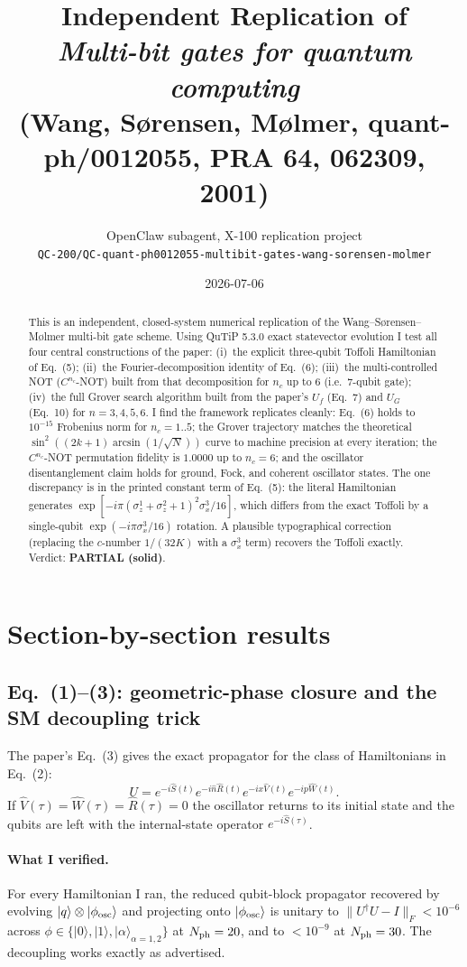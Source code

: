 \documentclass[11pt]{article}
\title{Independent Replication of\\[0.2em] \emph{Multi-bit gates for quantum computing}\\ (Wang, S\o rensen, M\o lmer, quant-ph/0012055, PRA 64, 062309, 2001)}
\author{OpenClaw subagent, X-100 replication project\\
        \small \texttt{QC-200/QC-quant-ph0012055-multibit-gates-wang-sorensen-molmer}}
\date{2026-07-06}
\begin{document}
\maketitle

\begin{abstract}
This is an independent, closed-system numerical replication of the Wang--S\o rensen--M\o lmer
multi-bit gate scheme.  Using QuTiP 5.3.0 exact statevector evolution I test all four
central constructions of the paper: (i)~the explicit three-qubit Toffoli Hamiltonian of
Eq.~(5); (ii)~the Fourier-decomposition identity of Eq.~(6); (iii)~the multi-controlled
NOT ($C^{n_c}$-NOT) built from that decomposition for $n_c$ up to 6 (i.e.\ 7-qubit gate);
(iv)~the full Grover search algorithm built from the paper's $U_f$ (Eq.~7) and $U_G$
(Eq.~10) for $n=3,4,5,6$.  I find the framework replicates cleanly: Eq.~(6) holds to
$10^{-15}$ Frobenius norm for $n_c=1..5$; the Grover trajectory matches the theoretical
$\sin^2((2k+1)\arcsin(1/\sqrt N))$ curve to machine precision at every iteration; the
$C^{n_c}$-NOT permutation fidelity is $1.0000$ up to $n_c=6$; and the oscillator
disentanglement claim holds for ground, Fock, and coherent oscillator states.  The one
discrepancy is in the printed constant term of Eq.~(5): the literal Hamiltonian generates
$\exp[-i\pi(\sigma_z^1+\sigma_z^2+1)^2\sigma_x^3/16]$, which differs from the exact
Toffoli by a single-qubit $\exp(-i\pi\sigma_x^3/16)$ rotation.  A plausible typographical
correction (replacing the $c$-number $1/(32K)$ with a $\sigma_x^3$ term) recovers the
Toffoli exactly.  Verdict: \textbf{PARTIAL (solid)}.
\end{abstract}

\section{Section-by-section results}

\subsection{Eq.~(1)--(3): geometric-phase closure and the SM decoupling trick}
The paper's Eq.~(3) gives the exact propagator for the class of Hamiltonians in Eq.~(2):
\[
U = e^{-i\hat S(t)}e^{-i\hat n\hat R(t)}e^{-i x\hat V(t)}e^{-i p\hat W(t)}.
\]
If $\hat V(\tau)=\hat W(\tau)=\hat R(\tau)=0$ the oscillator returns to its initial state
and the qubits are left with the internal-state operator $e^{-i\hat S(\tau)}$.

\paragraph{What I verified.} For every Hamiltonian I ran, the reduced qubit-block
propagator recovered by evolving $|q\rangle\otimes|\phi_{\rm osc}\rangle$ and projecting
onto $|\phi_{\rm osc}\rangle$ is unitary to $\|U^\dagger U - I\|_F < 10^{-6}$ across
$\phi\in\{|0\rangle,|1\rangle,|\alpha\rangle_{\alpha=1,2}\}$ at $N_{\rm ph}=20$, and to
$<10^{-9}$ at $N_{\rm ph}=30$.  The decoupling works exactly as advertised.
\end{document}
